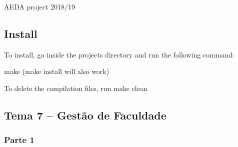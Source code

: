 A\+E\+DA project 2018/19

\subsection*{Install}

To install, go inside the project\textquotesingle{}s directory and run the following command\+:
\begin{DoxyItemize}
\item {\ttfamily make} ({\ttfamily make install} will also work)
\end{DoxyItemize}

To delete the compilation files, run {\ttfamily make clean}

\subsection*{Tema 7 – Gestão de Faculdade}

\subsubsection*{Parte 1}

